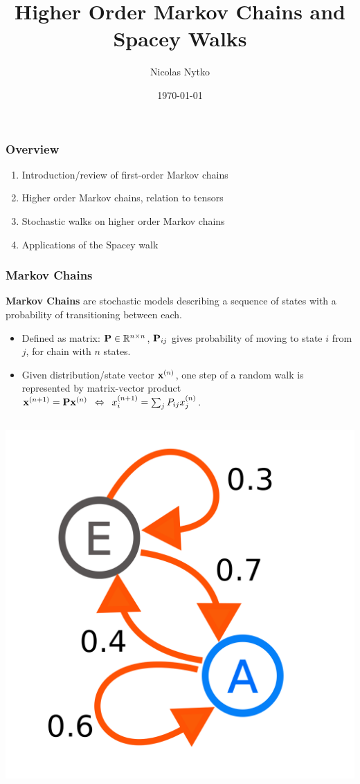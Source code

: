 \documentclass{beamer}
\title{Higher Order Markov Chains and Spacey Walks}
\author{Nicolas Nytko}
\date{\today}
\begin{document}
\frame{\titlepage}

\begin{frame}
  \frametitle{Overview}
  \begin{enumerate}
  \item Introduction/review of first-order Markov chains
  \item Higher order Markov chains, relation to tensors
  \item Stochastic walks on higher order Markov chains
  \item Applications of the Spacey walk
  \end{enumerate}
\end{frame}


\begin{frame}
\frametitle{Markov Chains}
{\bf Markov Chains} are stochastic models describing a sequence of states with a probability of transitioning between each.
\begin{itemize}
\item Defined as matrix: ${\bf P} \in \mathbb{R}^{n\times n}$, ${\bf P}_{ij}$ gives probability of moving to state $i$ from $j$, for chain with $n$ states.
\item Given distribution/state vector ${\bf x}^{(n)}$, one step of a random walk is represented by matrix-vector product ${\bf x}^{(n+1)} = {\bf P} {\bf x}^{(n)} \enskip \Leftrightarrow \enskip x^{(n+1)}_i = \sum_j P_{ij} x^{(n)}_j $.
\end{itemize}

\begin{block}{}
\begin{columns}
\begin{column}{0.5\linewidth}
\centering
\includegraphics[scale=0.072]{images/markov.png}
\end{column}


\end{columns}
\end{block}
\end{frame}
\end{document}

